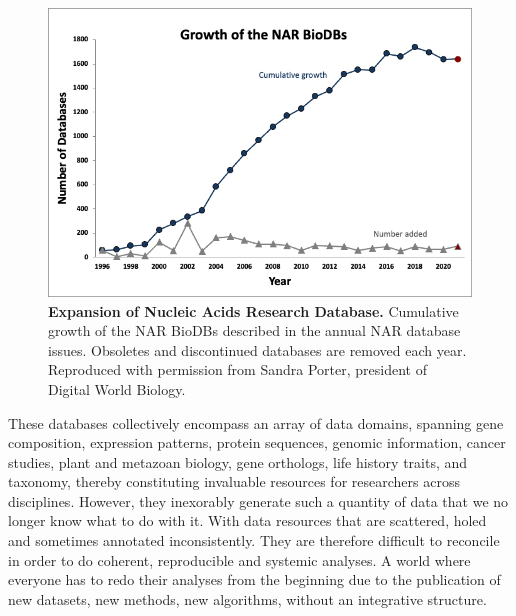\begin{figure}[h]
    \centering
    \includegraphics[width=.7\linewidth]{figures/nar_biodb.jpg}
    \caption[Expansion of Nucleic Acids Research Database]{\textbf{Expansion of Nucleic Acids Research Database.} Cumulative growth of the NAR BioDBs described in the annual NAR database issues. Obsoletes and discontinued databases are removed each year. \\
    \scriptsize{Reproduced with permission from Sandra Porter, president of Digital World Biology.}}
    \label{fig:narbiodb}
\end{figure}
These databases collectively encompass an array of data domains, spanning gene composition, expression patterns, protein sequences, genomic information, cancer studies, plant and metazoan biology, gene orthologs, life history traits, and taxonomy, thereby constituting invaluable resources for researchers across disciplines. However, they inexorably generate such a quantity of data that we no longer know what to do with it. With data resources that are scattered, holed and sometimes annotated inconsistently. They are therefore difficult to reconcile in order to do coherent, reproducible and systemic analyses. A world where everyone has to redo their analyses from the beginning due to the publication of new datasets, new methods, new algorithms, without an integrative structure.